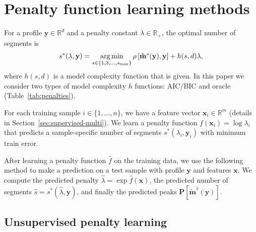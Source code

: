 \documentclass{article}
\DeclareMathOperator*{\argmin}{arg\,min}
\newcommand{\RR}{\mathbb R}
\begin{document}


\section{Penalty function learning methods}
\label{sec:penalty-learning}

For a profile $\mathbf y\in\RR^d$ and a penalty constant $\lambda\in\RR_+$, the
optimal number of segments is
\begin{equation}
  \label{eq:optimal_segments}
  s^*(\lambda, \mathbf y) =
  \argmin_{s\in\{1,3,\dots, s_{\text{\text{max}}}\}}
  \rho\left[
    \mathbf{\tilde m}^s(\mathbf y),
    \mathbf y
  \right]
  + h(s, d) \lambda,
\end{equation}
where $h(s, d)$ is a model complexity function that is given. In
this paper we consider two types of model complexity $h$ functions:
AIC/BIC and oracle (Table~\ref{tab:penalties}). 

For each training sample $i\in\{1,\dots, n\}$, we have a feature
vector $\mathbf x_i\in\RR^m$ (details in
Section~\ref{sec:supervised-multi}). We learn a penalty function
$f(\mathbf x_i) = \log \lambda_i$ that predicts a sample-specific
number of segments $s^*(\lambda_i, \mathbf y_i)$ with minimum train
error.

After learning a penalty function $\hat f$ on the training
data, we use the following method to make a prediction on a test
sample with profile $\mathbf y$ and features $\mathbf x$. We compute
the predicted penalty $\hat \lambda = \exp \hat f(\mathbf x)$, the
predicted number of segments $\hat s = s^*(\hat \lambda, \mathbf y)$,
and finally the predicted peaks $\mathbf P\left[ \mathbf{\tilde
    m}^{\hat s}(\mathbf y) \right]$.

\subsection{Unsupervised penalty learning}
\label{sec:unsupervised}
\end{document}
